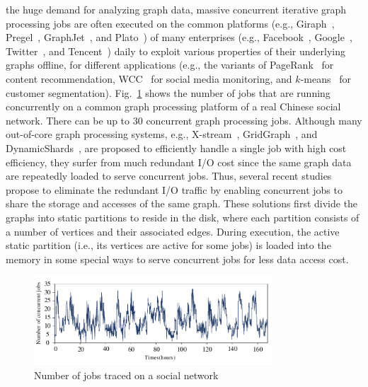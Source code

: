 \documentclass[10pt,journal,compsoc]{IEEEtran}
\begin{document}
 the huge demand for analyzing graph data, massive concurrent iterative graph processing jobs are often executed on the common platforms (e.g., Giraph~\cite{Giraph}, Pregel~\cite{Pregel}, GraphJet~\cite{GraphJet}, and Plato~\cite{Knightking,Gemini}) of many enterprises (e.g., Facebook~\cite{facebook}, Google~\cite{Google}, Twitter~\cite{twitter_web}, and Tencent~\cite{tencent}) daily to exploit various properties of their underlying graphs offline, for different applications (e.g., the variants of PageRank~\cite{PageRank} for content recommendation, WCC~\cite{SCC} for social media monitoring, and $k$-means~\cite{k-means} for customer segmentation). Fig.~\ref{number_jobs} shows the number of jobs that are running concurrently on a common graph processing platform of a real Chinese social network. There can be up to 30 concurrent graph processing jobs.
Although many out-of-core graph processing systems, e.g., X-stream~\cite{X-stream}, GridGraph~\cite{GridGraph}, and DynamicShards~\cite{Vora}, are proposed to efficiently handle a single job with high cost efficiency, they surfer from much redundant I/O cost since the same graph data are repeatedly loaded to serve concurrent jobs.
Thus, several recent studies~\cite{seraph,CGraph,GraphM,seraph1,CGraph2019} propose to eliminate the redundant I/O traffic by enabling concurrent jobs to share the storage and accesses of the same graph.
These solutions first divide the graphs into static partitions to reside in the disk, where each partition consists of a number of vertices and their associated edges.
During execution, the active static partition (i.e., its vertices are active for some jobs) is loaded into the memory in some special ways to serve concurrent jobs for less data access cost.


\begin{figure}[!t]
	\begin{minipage}[t]{0.48\textwidth}
		\centering
		\includegraphics[width=3.5in]{number_jobs.pdf}
		\vspace{-28pt}
		\caption{Number of jobs traced on a social network}
		\label{number_jobs}
	\end{minipage}
	\vspace{-18pt}
\end{figure}
\end{document}
